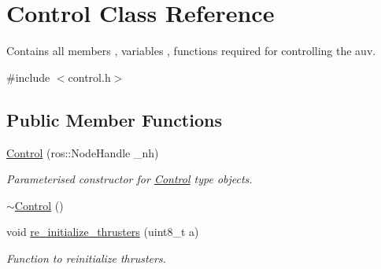 \hypertarget{classControl}{}\section{Control Class Reference}
\label{classControl}


Contains all members , variables , functions required for controlling the auv.  




{\ttfamily \#include $<$control.\+h$>$}

\subsection*{Public Member Functions}
\begin{DoxyCompactItemize}
\item 
\hyperlink{classControl_a7bb364fb0c2a6b5d016e2e54b7780bd5}{Control} (ros\+::\+Node\+Handle \+\_\+nh)
\begin{DoxyCompactList}\small\item\em Parameterised constructor for \hyperlink{classControl}{Control} type objects. \end{DoxyCompactList}\item 
\hyperlink{classControl_aedda1328c4f8b8d49bca8f0812d3bfd1}{$\sim$\+Control} ()
\item 
void \hyperlink{classControl_a82daf30e8fde43c32806596fc7af54a0}{re\+\_\+initialize\+\_\+thrusters} (uint8\+\_\+t a)
\begin{DoxyCompactList}\small\item\em Function to reinitialize thrusters. \end{DoxyCompactList}\end{DoxyCompactItemize}
